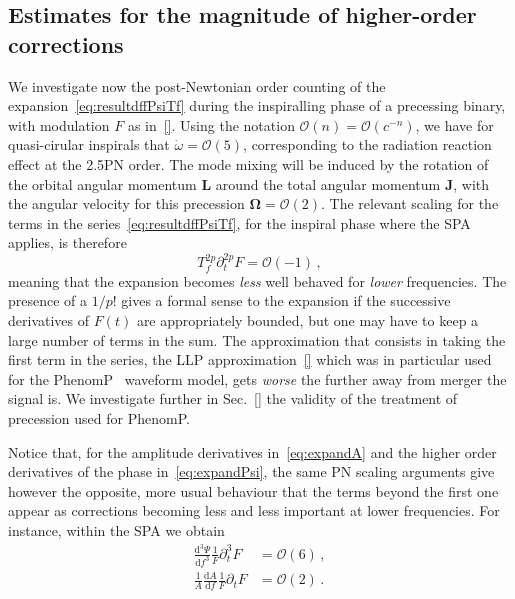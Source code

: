 \documentclass[aps,showpacs,%
prd,superscriptaddress,nofootinbib]{revtex4}
\newcommand{\be}{\begin{equation}}
\newcommand{\ee}{\end{equation}}
\newcommand\ud{{\mathrm{d}}}
\newcommand\calO{{\mathcal{O}}}
\newcommand{\Tf}{T_{f}}
\begin{document}
\subsection{Estimates for the magnitude of higher-order corrections}
\label{subsec:sizecorrPrec}

We investigate now the post-Newtonian order counting of the expansion~\eqref{eq:resultdffPsiTf} during the inspiralling phase of a precessing binary, with modulation $F$ as in~\eqref{}. Using the notation $\calO(n) = \calO(c^{-n})$, we have for quasi-cirular inspirals that $\dot{\omega} = \calO(5)$, corresponding to the radiation reaction effect at the 2.5PN order. The mode mixing will be induced by the rotation of the orbital angular momentum $\bm{L}$ around the total angular momentum $\bm{J}$, with the angular velocity for this precession $\bm{\Omega} = \calO(2)$. The relevant scaling for the terms in the series~\eqref{eq:resultdffPsiTf}, for the inspiral phase where the SPA applies, is therefore
\be
	\Tf^{2p} \partial_{t}^{2p} F = \calO(-1) \,,
\ee
meaning that the expansion becomes {\it less} well behaved for {\it lower} frequencies. The presence of a $1/p!$ gives a formal sense to the expansion if the successive derivatives of $F(t)$ are appropriately bounded, but one may have to keep a large number of terms in the sum. The approximation that consists in taking the first term in the series, the LLP approximation~\eqref{} which was in particular used for the PhenomP~\cite{} waveform model, gets {\it worse} the further away from merger the signal is. We investigate further in Sec.~\ref{} the validity of the treatment of precession used for PhenomP.

Notice that, for the amplitude derivatives in~\eqref{eq:expandA} and the higher order derivatives of the phase in~\eqref{eq:expandPsi}, the same PN scaling arguments give however the opposite, more usual behaviour that the terms beyond the first one appear as corrections becoming less and less important at lower frequencies. For instance, within the SPA we obtain
\begin{subequations}
\begin{align}
	\frac{\ud^{3} \Psi}{\ud f^{3}} \frac{1}{F} \partial_{t}^{3} F &= \calO(6) \,, \\
	\frac{1}{A}\frac{\ud A}{\ud f} \frac{1}{F} \partial_{t} F &= \calO(2) \,.
\end{align}
\end{subequations}
\end{document}
